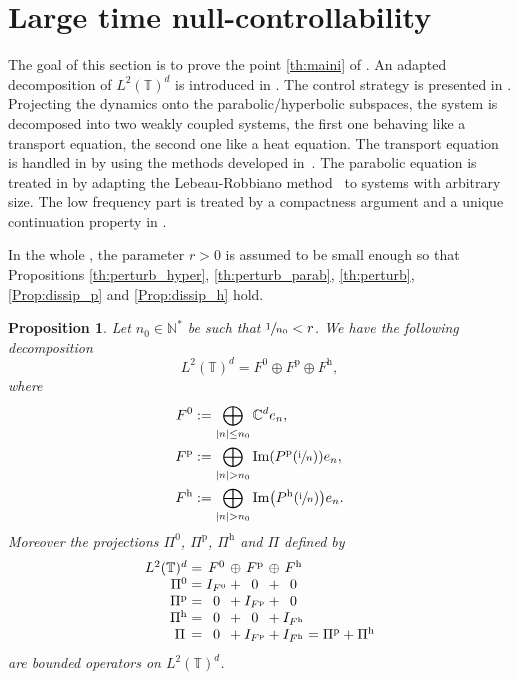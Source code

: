 \documentclass[10pt]{amsart}
\theoremstyle{plain}
\newtheorem{prop}[theorem]{Proposition}
\theoremstyle{definition}
\theoremstyle{remark}
\DeclareMathOperator{\Ima}{Im}
\newcommand{\set}{\mathbb}
\newcommand{\N}{\set{N}}
\newcommand{\T}{\set{T}}
\newcommand{\coloneqq}{\mathrel{\mathord{:}\mathord=}}
\newcommand{\h}{{\mathrm h}}
\newcommand{\p}{{\mathrm p}}
\newcommand{\iu}{\mathrm i}
\let\originalleft\left
\let\originalright\right
\renewcommand{\left}{\mathopen{}\mathclose\bgroup\originalleft}
\renewcommand{\right}{\aftergroup\egroup\originalright}
\begin{document}
\section{Large time null-controllability} \label{sec:NC}

The goal of this section is to prove the point \eqref{th:maini} of . An adapted decom\-position of $L^2(\T)^d$ is introduced in . The control strategy is presented in .
Projecting the dynamics onto the parabolic/hyperbolic subspaces, the system is decomposed into two weakly coupled systems, the first one behaving like a transport equation, the second one like a heat equation. The transport equation is handled in  by using the methods developed in~\cite{alabau-boussouira_2017}. The parabolic equation is treated in  by adapting the Lebeau-Robbiano method~\cite{lebeau_1995} to systems with arbitrary size. The low frequency part is treated by a compactness argument and a unique continuation property in .

In the whole , the parameter $r>0$ is assumed to be small enough so that Propositions \ref{th:perturb_hyper}, \ref{th:perturb_parab}, \ref{th:perturb}, \ref{Prop:dissip_p} and \ref{Prop:dissip_h} hold.

\Subsection{An adapted decomposition of $L^2(\T)^{d}$} \label{subsec:decomp}

\begin{prop}
\label{decompL2}
Let $n_0 \in \N^*$ be such that $\sfrac{1}{n_0} < r$. We have the following decomposition
\begin{equation}
\label{DecompRd}
L^2(\T)^{d} = F^0 \oplus F^\p \oplus F^\h,
\end{equation}
where
\begin{align}
\label{defW0}
F^0 &\coloneqq \bigoplus\limits_{|n| \leq n_0} \set C^d e_n,\\
\label{defWp}
F^\p &\coloneqq\bigoplus\limits_{|n| > n_0} \Ima\left(P^\p(\sfrac{\iu}{n})\right) e_n,\\
\label{defWh}
F^\h &\coloneqq\bigoplus\limits_{|n| > n_0} \Ima\left(P^\h(\sfrac{\iu}{n})\right) e_n.
\end{align}
Moreover the projections $\Pi^{0}$, $\Pi^{\p}$, $\Pi^{\h}$ and $\Pi$ defined by
\[
\begin{array}{r@{}c@{}c@{}c@{}c@{}c@{}c@{}c}
L^2(\T)^{d} &{}={}& F^0 & {}\oplus{} & F^\p & {}\oplus{} & F^\h & \\
\Pi^0 &{}={}& I_{F^0} & {}+{} & 0 & {}+{} & 0 & \\
\Pi^\p &{}={}& 0 & {}+{} & I_{F^\p} & {}+{} & 0 & \\
\Pi^\h &{}={}& 0 & {}+{} & 0 & {}+{} & I_{F^\h} & \\
\Pi\, &{}={}& 0 & {}+{} & I_{F^\p} & {}+{} & I_{F^\h} & {}= \Pi^\p+\Pi^\h \end{array}
\]
are bounded operators on $L^2(\T)^d$.
\end{prop}
\end{document}

